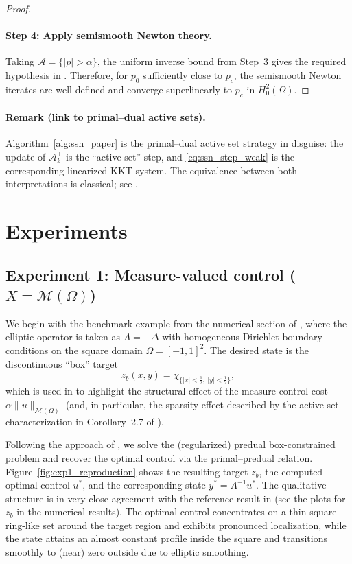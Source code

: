 \documentclass[11pt,a4paper]{article}
\begin{document}
\begin{proof}
\paragraph{Step 4: Apply semismooth Newton theory.}
Taking $\mathcal{A}=\{|p|>\alpha\}$, the uniform inverse bound from Step~3 gives the required hypothesis in \cite[Thm.~8.16]{ItoKunisch2008}.
Therefore, for $p_0$ sufficiently close to $p_c$, the semismooth Newton iterates are well-defined and converge superlinearly to $p_c$ in $H_0^2(\Omega)$.
\end{proof}

\paragraph{Remark (link to primal--dual active sets).}
Algorithm~\ref{alg:ssn_paper} is the primal--dual active set strategy in disguise:
the update of $\mathcal{A}_k^\pm$ is the ``active set'' step, and \eqref{eq:ssn_step_weak} is the corresponding linearized KKT system.
The equivalence between both interpretations is classical; see \cite{HintermuellerItoKunisch2002}.

\section{Experiments}\label{sec:experiments}

\subsection{Experiment 1: Measure-valued control ($X=\mathcal{M}(\Omega)$)}\label{subsec:exp1_measures}

We begin with the benchmark example from the numerical section of \cite{ClasonKunisch2009}, where the elliptic operator is taken as
$A=-\Delta$ with homogeneous Dirichlet boundary conditions on the square domain
$\Omega=[-1,1]^2$.
The desired state is the discontinuous ``box'' target
\[
z_b(x,y)=\chi_{\{|x|<\tfrac12,\ |y|<\tfrac12\}},
\]
which is used in \cite{ClasonKunisch2009} to highlight the
structural effect of the measure control cost $\alpha\|u\|_{\mathcal{M}(\Omega)}$
(and, in particular, the sparsity effect described by the active-set characterization in Corollary~2.7 of \cite{ClasonKunisch2009}).

Following the approach of \cite{ClasonKunisch2009}, we solve the (regularized) predual box-constrained problem and recover the optimal control via the primal--predual relation.
Figure~\ref{fig:exp1_reproduction} shows the resulting target $z_b$, the computed optimal control $u^\ast$, and the corresponding state $y^\ast=A^{-1}u^\ast$.
The qualitative structure is in very close agreement with the reference result in \cite{ClasonKunisch2009} (see the plots for $z_b$ in the numerical results). The optimal control concentrates on a thin square ring-like set around the target region and exhibits pronounced localization, while the state attains an almost constant profile inside the square and transitions smoothly to (near) zero outside due to elliptic smoothing.
\end{document}
